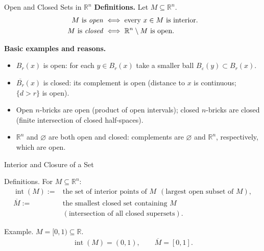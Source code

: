 \begin{frame}{Open and Closed Sets in $\mathbb{R}^n$}
\textbf{Definitions.} Let $M\subseteq\mathbb{R}^n$.
\begin{align*}
M \text{ is \emph{open}} &\iff \text{every }x\in M\text{ is interior.}\\
M \text{ is \emph{closed}} &\iff \mathbb{R}^n\setminus M \text{ is open.}
\end{align*}

\textbf{Basic examples and reasons.}
\begin{itemize}
\item $B_r(x)$ is open: for each $y\in B_r(x)$ take a smaller ball $B_\varepsilon(y)\subset B_r(x)$.
\item $\overline{B_r}(x)$ is closed: its complement is open (distance to $x$ is continuous; $\{d>r\}$ is open).
\item Open $n$-bricks are open (product of open intervals); closed $n$-bricks are closed (finite intersection of closed half-spaces).
\item $\mathbb{R}^n$ and $\varnothing$ are both open and closed: complements are $\varnothing$ and $\mathbb{R}^n$, respectively, which are open.
\end{itemize}
\end{frame}

\begin{frame}{Interior and Closure of a Set}
\begin{block}{Definitions.} For $M\subseteq\mathbb{R}^n$:
\begin{align*}
\operatorname{int}(M) :=& \text{the set of interior points of }M\ \ (\text{largest open subset of }M),\\
\overline{M} :=& \text{the smallest closed set containing }M\\ &(\text{intersection of all closed supersets}).
\end{align*}
\end{block}

\begin{block}{Example.} $M=[0,1)\subseteq\mathbb{R}$.
\begin{align*}
\operatorname{int}(M)=(0,1),\qquad \overline{M}=[0,1].
\end{align*}
\end{block}
\end{frame}

